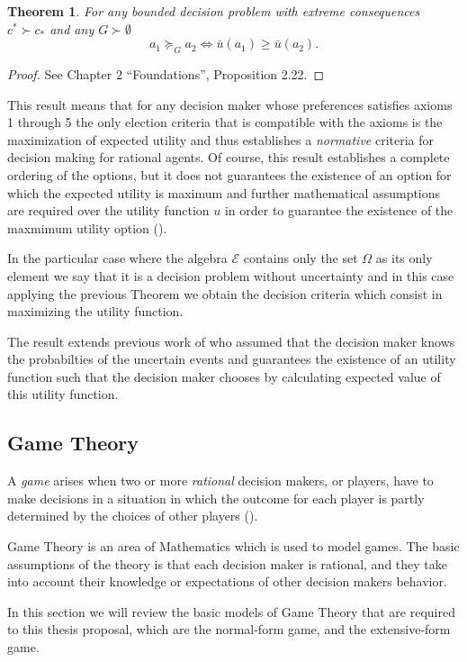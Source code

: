 \documentclass[11pt]{article}
\theoremstyle{plain}
\newtheorem{teo}{Theorem}
\begin{document}
	\begin{teo}
	For any bounded decision problem with extreme consequences $c^\ast \succ c_\ast$ and any $G \succ \emptyset$
	\[ a_1 \succeq_G a_2 \Leftrightarrow \bar{u}(a_1) \geq \bar{u}(a_2). \]
	\end{teo}
	\begin{proof}
	See \cite{bernardo2000bayesian} Chapter 2 “Foundations”, Proposition 2.22.
	\end{proof}
	This result means that for any decision maker whose preferences satisfies axioms 1 through 5 the only election criteria that is compatible with the axioms is the maximization of expected utility and thus establishes a \textit{normative} criteria for decision making for rational agents. Of course, this result establishes a complete ordering of the options, but it does not guarantees the existence of an option for which the expected utility is maximum and further mathematical assumptions are required over the utility function $u$ in order to guarantee the existence of the maxmimum utility option (\cite{bernardo2000bayesian}).
	
	In the particular case where the algebra $\mathcal{E}$ contains only the set $\Omega$ as its only element we say that it is a decision problem without uncertainty and in this case applying the previous Theorem we obtain the decision criteria which consist in maximizing the utility function.
	
	The result extends previous work of \cite{von1944theory} who assumed that the decision maker knows the probabilties of the uncertain events and guarantees the existence of an utility function such that the decision maker chooses by calculating expected value of this utility function.
	\subsection{Game Theory}
	A \textit{game} arises when two or more \textit{rational} decision makers, or players, have to make decisions in a situation in which the outcome for each player is partly determined by the choices of other players (\cite{binmore2008rational}).
	
	Game Theory is an area of Mathematics which is used to model games. The basic assumptions of the theory is that each decision maker is rational, and they take into account their knowledge or expectations of other decision makers behavior.
	
	In this section we will review the basic models of Game Theory that are required to this thesis proposal, which are the normal-form game, and the extensive-form game. 
\end{document}
